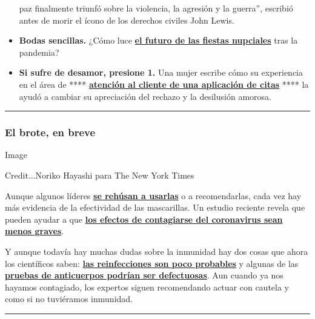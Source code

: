 \begin{itemize}
  paz finalmente triunfó sobre la violencia, la agresión y la guerra'',
  escribió antes de morir el ícono de los derechos civiles John Lewis.
\item
  \textbf{Bodas sencillas.} ¿Cómo luce
  \textbf{\href{https://www.nytimes.com/es/2020/07/18/espanol/estilos-de-vida/bodas-coronavirus.html}{el
  futuro de las fiestas nupciales}} tras la pandemia?
\item
  \textbf{Si sufre de desamor, presione 1.} Una mujer escribe cómo su
  experiencia en el área de ****
  \textbf{\href{https://www.nytimes.com/es/2020/07/26/espanol/estilos-de-vida/citas-en-linea-amor.html}{atención
  al cliente de una aplicación de citas}} **** la ayudó a cambiar su
  apreciación del rechazo y la desilusión amorosa.
\end{itemize}

\begin{center}\rule{0.5\linewidth}{\linethickness}\end{center}

\hypertarget{el-brote-en-breve}{%
\subsubsection{El brote, en breve}\label{el-brote-en-breve}}

Image

Credit...Noriko Hayashi para The New York Times

Aunque algunos líderes
\textbf{\href{https://www.nytimes.com/es/2020/07/30/espanol/opinion/usar-cubrebocas-politica.html}{se
rehúsan a usarlas}} o a recomendarlas, cada vez hay más evidencia de la
efectividad de las mascarillas. Un estudio reciente revela que pueden
ayudar a que
\textbf{\href{https://www.nytimes.com/es/2020/07/29/espanol/ciencia-y-tecnologia/proteccion-cubrebocas-coronavirus.html}{los
efectos de contagiarse del coronavirus sean menos graves}}.

Y aunque todavía hay muchas dudas sobre la inmunidad hay dos cosas que
ahora los científicos saben:
\textbf{\href{https://www.nytimes.com/es/2020/07/24/espanol/ciencia-y-tecnologia/reinfeccion-coronavirus.html}{las
reinfecciones son poco probables}} y algunas de las
\textbf{\href{https://www.nytimes.com/es/2020/07/28/espanol/ciencia-y-tecnologia/anticuerpos-coronavirus-inmunidad.html}{pruebas
de anticuerpos podrían ser defectuosas}}. Aun cuando ya nos hayamos
contagiado, los expertos siguen recomendando actuar con cautela y como
si no tuviéramos inmunidad.

\begin{center}\rule{0.5\linewidth}{\linethickness}\end{center}

